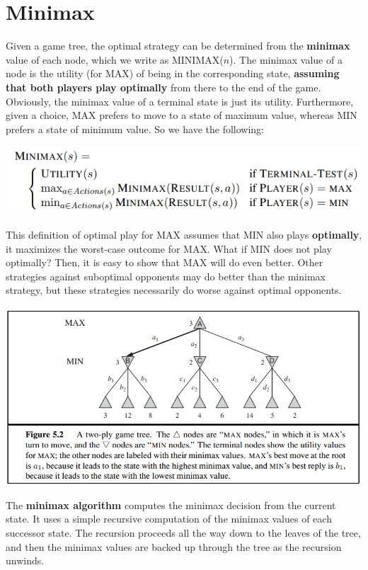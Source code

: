 \section{Minimax}
Given a game tree, the optimal strategy can be determined from the \textbf{minimax} value of each node, which we write as MINIMAX($n$). The minimax value of a node is the utility (for MAX) of being in the corresponding state, \textbf{assuming that both players play optimally} from there to the end of the game. Obviously, the minimax value of a terminal state is just its utility.  Furthermore, given a choice, MAX prefers to move to a state of maximum value, whereas MIN prefers a state of minimum value. So we have the following:
\begin{center}
    \includegraphics[]{images/minimax.png}
\end{center}
This definition of optimal play for MAX assumes that MIN also plays \textbf{optimally}, it maximizes the worst-case outcome for MAX. What if MIN does not play optimally? Then, it is easy to show that MAX will do even better. Other strategies against suboptimal opponents may do better than the minimax strategy, but these strategies necessarily do worse against optimal opponents.
\begin{center}
    \includegraphics[]{images/minimax-game tree.png}
\end{center}
The \textbf{minimax algorithm} computes the minimax decision from the current state. It uses a simple recursive computation of the minimax values of each successor state. The recursion proceeds all the way down to the leaves of the tree, and then the minimax values are backed up through the tree as the recursion unwinds.
